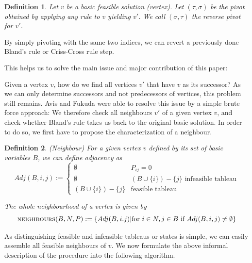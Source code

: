 \documentclass[a4paper, 11pt]{article}
\makeatletter
\newtheorem{mydef}{Definition}
\renewenvironment{quotation}
{\list{}{\listparindent=1.5em
		\itemindent=0pt
		\parsep\z@ \@plus\p@}%
	\item\relax}
{\endlist}
\makeatother
\begin{document}
\begin{mydef}
	Let $v$ be a basic feasible solution (vertex).\medskip
	Let $(\tau, \sigma)$ be the pivot obtained by applying \emph{any} rule to $v$ yielding $v'$.  \medskip
	We call $(\sigma, \tau)$ the \textit{reverse pivot} for $v'$.
\end{mydef}

By simply pivoting with the same two indices, we can revert a previously done Bland's rule or Criss-Cross rule step. \medskip

This helps us to solve the main issue and major contribution of this paper:\medskip
\begin{quotation}
	Given a vertex $v$, how do we find all vertices $v'$ that have $v$ as its successor?
\end{quotation}
As we can only determine successors and not predecessors of vertices, this problem still remains. Avis and Fukuda were able to resolve this issue by a simple brute force approach: We therefore check all neighbours $v'$ of a given vertex $v$, and check whether Bland's rule takes us back to the original basic solution. In order to do so, we first have to propose the characterization of a neighbour.\medskip

\begin{mydef}(Neighbour)\medskip
	For a given vertex $v$ defined by its set of basic variables $B$, we can define \emph{adjacency} as\medskip
	\begin{equation*}
		Adj(B, i,j) := \left\{ \begin{matrix}
			\emptyset&P_{ij}=0\\
			\emptyset&(B\cup \{i\})-\{j\} \text{ infeasible tableau}\\
			
			(B\cup \{i\})-\{j\}&\text{feasible tableau}
		\end{matrix} \right.
	\end{equation*}
	
	The whole neighbourhood of a vertex is given by
	\begin{equation}
		\textsc{neighbours}(B,N,P):=\{ Adj(B,i.j) | \text{for }i\in N, j\in B\text{ if } Adj(B,i,j)\neq\emptyset \}
	\end{equation}

\end{mydef}

As distinguishing feasible and infeasible tableaus or states is simple, we can easily assemble all feasible neighbours of $v$. We now formulate the above informal description of the procedure into the following algorithm.
\end{document}
